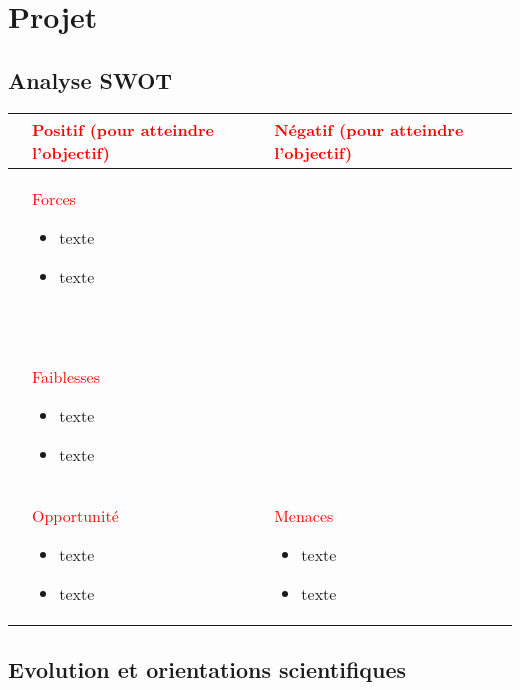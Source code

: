 \section{Projet}
	
		\subsection{Analyse SWOT}
		 
 
		 \renewcommand{\labelitemi}{$\bullet$}
		 
			\begin{table}[H]
			\begin{tabularx}{\textwidth}{|>{\centering\arraybackslash}l|>{\centering\arraybackslash}X|>{\centering\arraybackslash}X|}
			\hline
			&\textcolor{red}{Positif (pour atteindre l'objectif)} & \textcolor{red}{Négatif (pour atteindre l'objectif)}\\
			\hline
			\color{red}\parbox[t]{2mm}{} & \centering\textcolor{red}{Forces} 
			\smallskip
			\begin{itemize}
			\item  texte
			\item  texte
			\end{itemize} ~\\ & \textcolor{red}{Faiblesses}
			\smallskip
			\begin{itemize}
			\item  texte
			\item  texte
			\end{itemize}\\
			\hline
			\centering\color{red}\parbox[t]{2mm}{} & \centering\textcolor{red}{Opportunité} 
			\smallskip
			\begin{itemize} 
			\item  texte
			\item  texte
			\end{itemize} & \textcolor{red}{Menaces}
			\smallskip
			\begin{itemize} 
			\item texte
			\item texte
			\end{itemize}\\
			\hline
			\end{tabularx}
			\end{table}
		 

		\subsection{Evolution et orientations scientifiques}
		
		 
